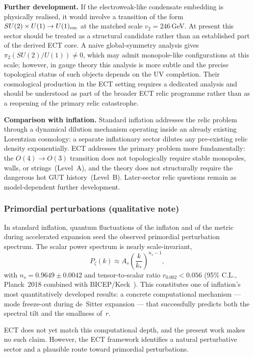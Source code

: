 \documentclass[11pt,a4paper]{article}
\numberwithin{equation}{section}
\begin{document}
\textbf{Further development.}
If the electroweak-like condensate embedding is physically realised,
it would involve a transition of the form
$SU(2)\times U(1)\to U(1)_{\rm em}$ at the matched scale
$v_2=246$\,GeV.
At present this sector should be treated as a structural candidate
rather than an established part of the derived ECT core.
A naive global-symmetry analysis gives $\pi_2(SU(2)/U(1))\neq 0$, which
may admit monopole-like configurations at this scale; however, in gauge
theory this analysis is more subtle and the precise topological status of
such objects depends on the UV completion.
Their cosmological production in the ECT setting requires a dedicated
analysis and should be understood as part of the broader ECT relic
programme rather than as a reopening of the primary relic catastrophe.

\textbf{Comparison with inflation.}
Standard inflation addresses the relic problem through a dynamical dilution
mechanism operating inside an already existing Lorentzian cosmology: a
separate inflationary sector dilutes any pre-existing relic density
exponentially.
ECT addresses the primary problem more fundamentally:
the $O(4)\to O(3)$ transition does not topologically require stable
monopoles, walls, or strings~(Level~A), and the theory does not
structurally require the dangerous hot GUT history~(Level~B).
Later-sector relic questions remain as model-dependent further
development.

\subsubsection*{Primordial perturbations (qualitative note)}
\label{sec:primordial_perturbations_ectnote}
In standard inflation, quantum fluctuations of the inflaton and of the
metric during accelerated expansion seed the observed primordial
perturbation spectrum.
The scalar power spectrum is nearly scale-invariant,
\begin{equation}
  P_\zeta(k) \approx A_s \left(\frac{k}{k_*}\right)^{n_s-1},
  \label{eq:pzeta}
\end{equation}
with $n_s = 0.9649\pm 0.0042$ and tensor-to-scalar ratio
$r_{0.002} < 0.056$ (95\% C.L., Planck~2018 combined with
BICEP/Keck~\cite{Planck2018,BICEP2021}).
This constitutes one of inflation's most quantitatively developed
results: a concrete computational mechanism --- mode freeze-out during
de~Sitter expansion --- that successfully predicts both the spectral
tilt and the smallness of~$r$.

ECT does not yet match this computational depth, and the present work
makes no such claim.
However, the ECT framework identifies a natural perturbative sector
and a plausible route toward primordial perturbations.
\end{document}
